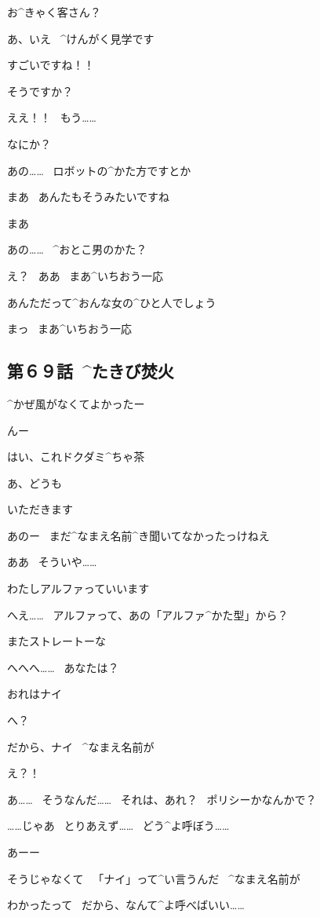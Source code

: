\page[42]
\NA お^{きゃく}{客}さん？

\A あ、いえ
\ ^{けんがく}{見学}です

\A すごいですね！！

\NA そうですか？

\A ええ！！
\ もう……

\page
\NA なにか？

\A あの……
\ ロボットの^{かた}{方}ですとか

\NA まあ
\ あんたもそうみたいですね

\A まあ

\page
\A あの……
\ ^{おとこ}{男}のかた？

\NA え？
\ ああ
\ まあ^{いちおう}{一応}

\NA あんただって^{おんな}{女}の^{ひと}{人}でしょう

\A まっ
\ まあ^{いちおう}{一応}


\subsection{第６９話\ ^{たきび}{焚火}}

\page[46]
\A ^{かぜ}{風}がなくてよかったー

\NA んー

\NA はい、これドクダミ^{ちゃ}{茶}

\A あ、どうも

\A いただきます

\page
\A あのー
\ まだ^{なまえ}{名前}^{き}{聞}いてなかったっけねえ

\NA ああ
\ そういや……

\A わたしアルファっていいます

\NA へえ……
\ アルファって、あの「アルファ^{かた}{型}」から？

\NA またストレートーな

\A へへへ……
\ あなたは？

\page
\NA おれはナイ

\A へ？

\NA だから、ナイ
\ ^{なまえ}{名前}が

\A え？！

\A あ……
\ そうなんだ……
\ それは、あれ？
\ ポリシーかなんかで？

\A ……じゃあ
\ とりあえず……
\ どう^{よ}{呼}ぼう……

\NA あーー

\page
\NA そうじゃなくて
\ 「ナイ」って^{い}{言}うんだ
\ ^{なまえ}{名前}が

\A わかったって
\ だから、なんて^{よ}{呼}べばいい……


